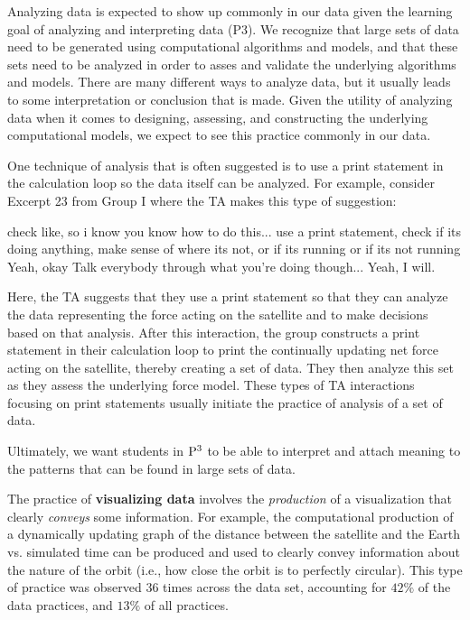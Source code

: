 \documentclass{msuphddissertation}
\begin{document}
\begin{doublespace}
Analyzing data is expected to show up commonly in our data given the learning goal of analyzing and interpreting data (P3).  We recognize that large sets of data need to be generated using computational algorithms and models, and that these sets need to be analyzed in order to asses and validate the underlying algorithms and models.  There are many different ways to analyze data, but it usually leads to some interpretation or conclusion that is made.  Given the utility of analyzing data when it comes to designing, assessing, and constructing the underlying computational models, we expect to see this practice commonly in our data.

One technique of analysis that is often suggested is to use a print statement in the calculation loop so the data itself can be analyzed.  For example, consider Excerpt 23 from Group I where the TA makes this type of suggestion: \begin{description}
\TA check like, so i know you know how to do this... use a print statement, check if its doing anything, make sense of where its not, or if its running or if its not running
\SB Yeah, okay
\TA Talk everybody through what you're doing though...
\SB Yeah, I will.\end{description}  Here, the TA suggests that they use a print statement so that they can analyze the data representing the force acting on the satellite and to make decisions based on that analysis.  After this interaction, the group constructs a print statement in their calculation loop to print the continually updating net force acting on the satellite, thereby creating a set of data.  They then analyze this set as they assess the underlying force model.  These types of TA interactions focusing on print statements usually initiate the practice of analysis of a set of data.

Ultimately, we want students in ${\rm P}^{3}$ to be able to interpret and attach meaning to the patterns that can be found in large sets of data.

%
%
%

The practice of \textbf{visualizing data} involves the \textit{production} of a visualization that clearly \textit{conveys} some information.  For example, the computational production of a dynamically updating graph of the distance between the satellite and the Earth vs. simulated time can be produced and used to clearly convey information about the nature of the orbit (i.e., how close the orbit is to perfectly circular).  This type of practice was observed $36$ times across the data set, accounting for $42\%$ of the data practices, and $13\%$ of all practices.


\end{doublespace}
\end{document}
